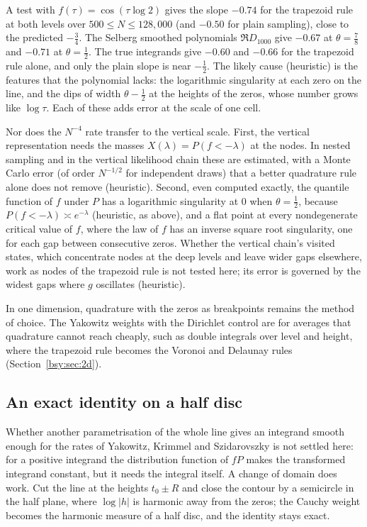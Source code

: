 A test with $f(\tau)=\cos(\tau\log2)$ gives the slope $-0.74$ for the trapezoid rule at both levels over $500\le N\le128{,}000$ (and $-0.50$ for plain sampling), close to the predicted $-\frac34$. The Selberg smoothed polynomials $\Re D_{1000}$ give $-0.67$ at $\theta=\frac78$ and $-0.71$ at $\theta=\frac12$. The true integrands give $-0.60$ and $-0.66$ for the trapezoid rule alone, and only the plain slope is near $-\frac12$. The likely cause (heuristic) is the features that the polynomial lacks: the logarithmic singularity at each zero on the line, and the dips of width $\theta-\frac12$ at the heights of the zeros, whose number grows like $\log\tau$. Each of these adds error at the scale of one cell.

Nor does the $N^{-4}$ rate transfer to the vertical scale. First, the vertical representation needs the masses $X(\lambda)=P(f<-\lambda)$ at the nodes. In nested sampling and in the vertical likelihood chain these are estimated, with a Monte Carlo error (of order $N^{-1/2}$ for independent draws) that a better quadrature rule alone does not remove (heuristic). Second, even computed exactly, the quantile function of $f$ under $P$ has a logarithmic singularity at $0$ when $\theta=\frac12$, because $P(f<-\lambda)\asymp e^{-\lambda}$ (heuristic, as above), and a flat point at every nondegenerate critical value of $f$, where the law of $f$ has an inverse square root singularity, one for each gap between consecutive zeros. Whether the vertical chain's visited states, which concentrate nodes at the deep levels and leave wider gaps elsewhere, work as nodes of the trapezoid rule is not tested here; its error is governed by the widest gaps where $g$ oscillates (heuristic).

In one dimension, quadrature with the zeros as breakpoints remains the method of choice. The Yakowitz weights with the Dirichlet control are for averages that quadrature cannot reach cheaply, such as double integrals over level and height, where the trapezoid rule becomes the Voronoi and Delaunay rules (Section~\ref{bsy:sec:2d}).

\subsection{An exact identity on a half disc}\label{bsy:sec:halfdisk}

Whether another parametrisation of the whole line gives an integrand smooth enough for the rates of Yakowitz, Krimmel and Szidarovszky is not settled here: for a positive integrand the distribution function of $fP$ makes the transformed integrand constant, but it needs the integral itself. A change of domain does work. Cut the line at the heights $t_0\pm R$ and close the contour by a semicircle in the half plane, where $\log|h|$ is harmonic away from the zeros; the Cauchy weight becomes the harmonic measure of a half disc, and the identity stays exact.

